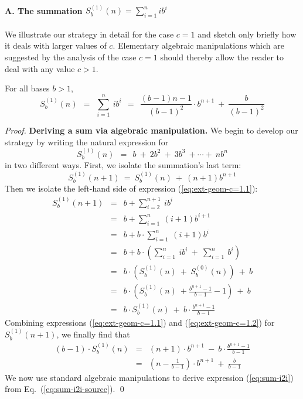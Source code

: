 \paragraph{A. The summation $S^{(1)}_b(n) = \sum_{i=1}^n i b^i$}

We illustrate our strategy in detail for the case $c=1$ and sketch only briefly how it deals with larger values of $c$.  Elementary algebraic manipulations which are suggested by the analysis of the case $c=1$ should thereby allow the reader to deal with any value $c > 1$.

\begin{prop}
\label{thm:sum-i2i}
For all bases $b > 1$,
\begin{equation}
\label{eq:sum-i2i}
S_b^{(1)}(n) \ \ = \ \
\sum_{i=1}^n \ i b^i
\ \ = \ \ 
\frac{(b-1)n -1}{(b-1)^2} \cdot  b^{n+1} \ + \ \frac{b}{(b-1)^2}
\end{equation}
\end{prop}

\begin{proof}
{\bf Deriving a sum via algebraic manipulation.}
We begin to develop our strategy by writing the natural expression for
\[ S_b^{(1)}(n) \ \ = \ \ b \ + \ 2b^2 \ + \ 3 b^3 \ + \cdots + \ n b^n  \]
in two different ways.  First, we isolate the summation's last term:
\begin{equation}
\label{eq:ext-geom-c=1.1}
S_b^{(1)}(n+1) \ = \ S_b^{(1)}(n) \ + \ (n+1) b^{n+1}
\end{equation}
Then we isolate the left-hand side of expression (\ref{eq:ext-geom-c=1.1}):
\begin{eqnarray}
\nonumber
S_b^{(1)}(n+1)
     & = &
b + \sum_{i=2}^{n+1} \ i b^{i}  \\
\nonumber
& = &
b + \sum_{i=1}^n \ (i+1) b^{i+1}  \\
\nonumber
     & = &
b +  b \cdot \sum_{i=1}^n \ (i+1) b^i \\
\nonumber
     & = &
b + 
b \cdot \left(
\sum_{i=1}^n \ i b^i 
 \ + \
\sum_{i=1}^n \  b^i 
\right) \\
\nonumber
     & = &
b \cdot \left( S_b^{(1)}(n) \ + \ S_b^{(0)}(n) \right) \ + \ b \\
\nonumber
& = &
b \cdot \left( S_b^{(1)}(n) \ +  \frac{b^{n+1} -1}{b-1} -1 \right) \ + \ b \\
\label{eq:ext-geom-c=1.2}
    & = &
b \cdot S_b^{(1)}(n) \ + \ b \cdot \frac{b^{n+1} - 1}{b-1}
\end{eqnarray}
Combining expressions (\ref{eq:ext-geom-c=1.1}) and (\ref{eq:ext-geom-c=1.2}) for $S_b^{(1)}(n+1)$, we finally find that
\begin{eqnarray}
\nonumber
(b-1) \cdot S_b^{(1)}(n) & = &
(n+1) \cdot b^{n+1} \ - \ b \cdot \frac{b^{n+1} -1}{b-1} \\
\label{eq:sum-i2i-source}
 & = &
\left( n - \frac{1}{b-1} \right) \cdot b^{n+1} \ + \ \frac{b}{b-1}
\end{eqnarray}
We now use standard algebraic manipulations to derive expression (\ref{eq:sum-i2i}) from Eq.~(\ref{eq:sum-i2i-source}).  \qed
\end{proof}

